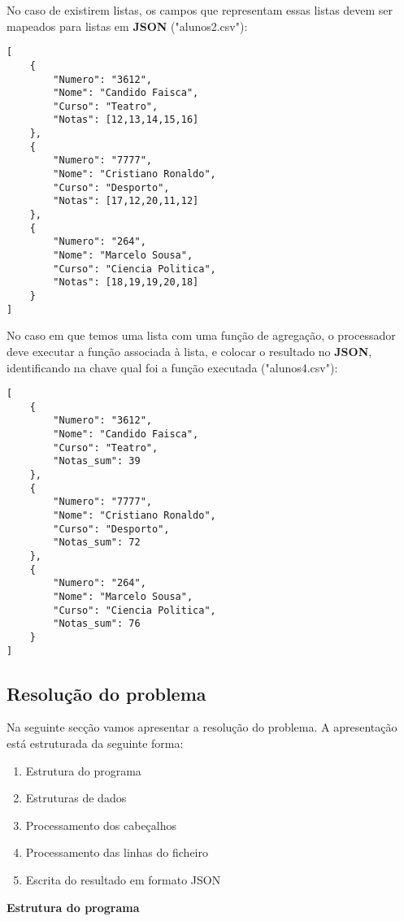 \documentclass[11pt,a4paper]{report}
\begin{document}
\item No caso de existirem listas, os campos que representam essas listas devem ser mapeados para listas em \textbf{JSON} ("alunos2.csv"):

\begin{lstlisting}[]
[
    {
        "Numero": "3612",
        "Nome": "Candido Faisca",
        "Curso": "Teatro",
        "Notas": [12,13,14,15,16]
    },
    {
        "Numero": "7777",
        "Nome": "Cristiano Ronaldo",
        "Curso": "Desporto",
        "Notas": [17,12,20,11,12]
    },
    {
        "Numero": "264",
        "Nome": "Marcelo Sousa",
        "Curso": "Ciencia Politica",
        "Notas": [18,19,19,20,18]
    }
]
\end{lstlisting}

\item No caso em que temos uma lista com uma função de agregação, o processador deve executar a função associada à lista, e colocar o resultado no \textbf{JSON}, identificando na chave qual foi a função executada ("alunos4.csv"):
\begin{lstlisting}[]
[
    {
        "Numero": "3612",
        "Nome": "Candido Faisca",
        "Curso": "Teatro",
        "Notas_sum": 39
    },
    {
        "Numero": "7777",
        "Nome": "Cristiano Ronaldo",
        "Curso": "Desporto",
        "Notas_sum": 72
    },
    {
        "Numero": "264",
        "Nome": "Marcelo Sousa",
        "Curso": "Ciencia Politica",
        "Notas_sum": 76
    }
]
\end{lstlisting}
        
    \subsection{Resolução do problema}
    Na seguinte secção vamos apresentar a resolução do problema. A apresentação está estruturada da seguinte forma:\\
    \begin{enumerate}
        \item Estrutura do programa
        \item Estruturas de dados
        \item Processamento dos cabeçalhos
        \item Processamento das linhas do ficheiro
        \item Escrita do resultado em formato JSON\\
    \end{enumerate}

    \item\textbf{Estrutura do programa}
\end{document}
